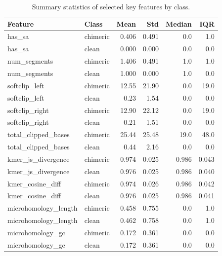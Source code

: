 \begin{table}[H]
\centering
\caption{Summary statistics of selected key features by class.}
\label{tab:key_feature_summary}
\begin{tabular}{llrrrr}
\toprule
Feature & Class & Mean & Std & Median & IQR \\
\midrule
has\_sa & chimeric & 0.406 & 0.491 & 0.0 & 1.0 \\
has\_sa & clean    & 0.000 & 0.000 & 0.0 & 0.0 \\

num\_segments & chimeric & 1.406 & 0.491 & 1.0 & 1.0 \\
num\_segments & clean    & 1.000 & 0.000 & 1.0 & 0.0 \\

softclip\_left & chimeric & 12.55 & 21.90 & 0.0 & 19.0 \\
softclip\_left & clean    & 0.23  & 1.54  & 0.0 & 0.0  \\

softclip\_right & chimeric & 12.90 & 22.12 & 0.0 & 19.0 \\
softclip\_right & clean    & 0.21  & 1.51  & 0.0 & 0.0  \\

total\_clipped\_bases & chimeric & 25.44 & 25.48 & 19.0 & 48.0 \\
total\_clipped\_bases & clean    & 0.44  & 2.16  & 0.0  & 0.0  \\

kmer\_js\_divergence & chimeric & 0.974 & 0.025 & 0.986 & 0.043 \\
kmer\_js\_divergence & clean    & 0.976 & 0.025 & 0.986 & 0.040 \\

kmer\_cosine\_diff & chimeric & 0.974 & 0.026 & 0.986 & 0.042 \\
kmer\_cosine\_diff & clean    & 0.976 & 0.025 & 0.986 & 0.041 \\

microhomology\_length & chimeric & 0.458 & 0.755 & 0.0 & 1.0 \\
microhomology\_length & clean    & 0.462 & 0.758 & 0.0 & 1.0 \\

microhomology\_gc  & chimeric & 0.172 & 0.361 & 0.0 & 0.0 \\
microhomology\_gc  & clean    & 0.172 & 0.361 & 0.0 & 0.0 \\
\bottomrule
\end{tabular}
\end{table}

